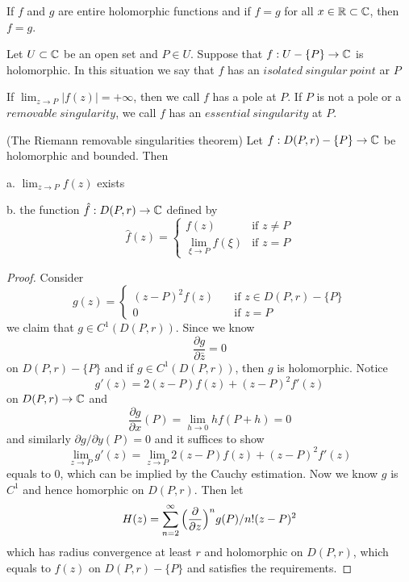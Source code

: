 \begin{corollary}
    If $f$ and $g$ are entire holomorphic functions and if $f=g$ for all $x\in\mathbb{R}\subset\mathbb{C}$, then $ f= g$.
\end{corollary}

\begin{definition}
    Let $U\subset\mathbb{C}$ be an open set and $P\in U$. Suppose that $f:U-\{P\}\to \mathbb{C}$ is holomorphic. In this situation we say that $f$ has an $isolated\ singular\ point$ ar $P$
\end{definition}

\begin{definition}
    If $\lim_{z\to P}|f(z)| = +\infty$, then we call $f$ has a pole at $P$. If $P$ is not a pole or a $removable\ singularity$, we call $f$ has an $essential\ singularity$ at $P$.
\end{definition}

\begin{theorem}
    (The Riemann removable singularities theorem) Let $f:D(P,r)-\{P\}\to\mathbb{C}$ be holomorphic and bounded. Then\par
    a. $\lim_{z\to P}f(z)$ exists\par
    b. the function $\hat{f}: D(P,r)\to\mathbb{C}$ defined by
    \[
    \hat{f}(z) = \begin{cases}
        f(z)\quad&\text{if }z\neq P\\
        \lim_{\xi\to P}f(\xi)&\text{if }z=P
    \end{cases}
    \]
\end{theorem}
\begin{proof}\par
    Consider
    \[
    g(z) = \begin{cases}
        (z-P)^2f(z)\quad&\text{if }z\in D(P,r)-\{P\} \\
        0&\text{if }z=P 
    \end{cases}
    \]
    we claim that $g\in C^1(D(P,r))$. Since we know
    \[
    \dfrac{\partial g}{\partial\bar{z}} = 0
    \]
    on $D(P,r)-\{P\}$ and if $g\in C^1(D(P,r))$, then $g$ is holomorphic. Notice
    \[
    g'(z) = 2(z-P)f(z) + (z-P)^2f'(z)
    \]
    on $D(P,r)\to \mathbb{C}$ and
    \[
    \dfrac{\partial g}{\partial x}(P) = \lim_{h\to 0} hf(P+h) = 0 
    \]
    and similarly $\partial g/\partial y (P) = 0$ and it suffices to show
    \[\lim_{z\to P} g'(z) = \lim_{z\to P} 2(z-P)f(z)+(z-P)^2f'(z)\]
    equals to $0$, which can be implied by the Cauchy estimation. Now we know $g$ is $C^1$ and hence homorphic on $D(P,r)$. Then let
    \[H(z) = \sum\limits_{n=2}^{\infty} \Big(\dfrac{\partial}{\partial z}\Big)^ng(P)/n! (z-P)^2\]
    which has radius convergence at least $r$ and holomorphic on $D(P,r)$, which equals to $f(z)$ on $D(P,r)-\{P\}$ and satisfies the requirements.
\end{proof}

